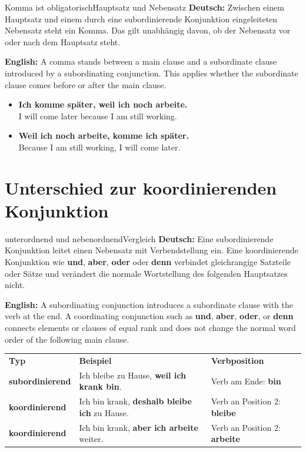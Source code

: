 \documentclass[a4paper,11pt]{article}
\newcommand{\GermanText}[1]{\textbf{Deutsch: }#1\par}
\newcommand{\EnglishText}[1]{{\small\color{SoftGray}\textbf{English: }#1\par}}
\newcommand{\ExampleItem}[2]{\item \textbf{#1}\\{\small\color{SoftGray}#2}}
\begin{document}
\begin{grammarentry}{Komma ist obligatorisch}{Hauptsatz und Nebensatz}
\GermanText{Zwischen einem Hauptsatz und einem durch eine subordinierende Konjunktion eingeleiteten Nebensatz steht ein Komma. Das gilt unabhängig davon, ob der Nebensatz vor oder nach dem Hauptsatz steht.}
\EnglishText{A comma stands between a main clause and a subordinate clause introduced by a subordinating conjunction. This applies whether the subordinate clause comes before or after the main clause.}
\end{grammarentry}

\begin{exbox}
\begin{itemize}
\ExampleItem{Ich komme später, weil ich noch arbeite.}{I will come later because I am still working.}
\ExampleItem{Weil ich noch arbeite, komme ich später.}{Because I am still working, I will come later.}
\end{itemize}
\end{exbox}

\section{Unterschied zur koordinierenden Konjunktion}

\begin{grammarentry}{unterordnend und nebenordnend}{Vergleich}
\GermanText{Eine subordinierende Konjunktion leitet einen Nebensatz mit Verbendstellung ein. Eine koordinierende Konjunktion wie \textbf{und}, \textbf{aber}, \textbf{oder} oder \textbf{denn} verbindet gleichrangige Satzteile oder Sätze und verändert die normale Wortstellung des folgenden Hauptsatzes nicht.}
\EnglishText{A subordinating conjunction introduces a subordinate clause with the verb at the end. A coordinating conjunction such as \textbf{und}, \textbf{aber}, \textbf{oder}, or \textbf{denn} connects elements or clauses of equal rank and does not change the normal word order of the following main clause.}
\end{grammarentry}

\begin{longtable}{>{\bfseries}p{4.2cm}|p{5.1cm}|p{4.7cm}}
\rowcolor{HeaderBlueDark}
\color{white}\textbf{Typ} &
\color{white}\textbf{Beispiel} &
\color{white}\textbf{Verbposition} \\
subordinierend & Ich bleibe zu Hause, \textbf{weil ich krank bin}. & Verb am Ende: \textbf{bin} \\
koordinierend & Ich bin krank, \textbf{deshalb bleibe ich} zu Hause. & Verb an Position 2: \textbf{bleibe} \\
koordinierend & Ich bin krank, \textbf{aber ich arbeite} weiter. & Verb an Position 2: \textbf{arbeite} \\
\end{longtable}
\end{document}

